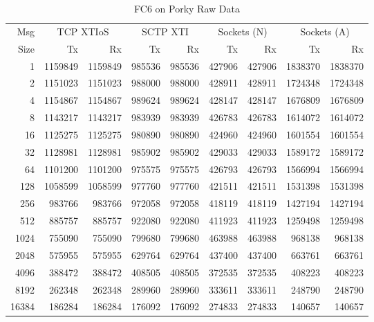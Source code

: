 \documentclass[letterpaper,final,notitlepage,twocolumn,10pt,twoside]{article}
\begin{document}
\begin{appendix}
\begin{table}[hbp]
\footnotesize
\begin{center}
\setlength{\tabcolsep}{0.2em}
\setlength{\arraycolsep}{0.2em}
\begin{tabular}{rrrrrrrrr}\\
Msg & \multicolumn{2}{c}{TCP XTIoS} & \multicolumn{2}{c}{SCTP XTI} & \multicolumn{2}{c}{Sockets (N)} & \multicolumn{2}{c}{Sockets (A)}\\
Size & Tx & Rx & Tx & Rx & Tx & Rx & Tx & Rx\\
\hline
\hline
1 & 1159849 & 1159849 & 985536 & 985536 & 427906 & 427906 & 1838370 & 1838370\\
2 & 1151023 & 1151023 & 988000 & 988000 & 428911 & 428911 & 1724348 & 1724348\\
4 & 1154867 & 1154867 & 989624 & 989624 & 428147 & 428147 & 1676809 & 1676809\\
8 & 1143217 & 1143217 & 983939 & 983939 & 426783 & 426783 & 1614072 & 1614072\\
16 & 1125275 & 1125275 & 980890 & 980890 & 424960 & 424960 & 1601554 & 1601554\\
32 & 1128981 & 1128981 & 985902 & 985902 & 429033 & 429033 & 1589172 & 1589172\\
64 & 1101200 & 1101200 & 975575 & 975575 & 426793 & 426793 & 1566994 & 1566994\\
128 & 1058599 & 1058599 & 977760 & 977760 & 421511 & 421511 & 1531398 & 1531398\\
256 & 983766 & 983766 & 972058 & 972058 & 418119 & 418119 & 1427194 & 1427194\\
512 & 885757 & 885757 & 922080 & 922080 & 411923 & 411923 & 1259498 & 1259498\\
1024 & 755090 & 755090 & 799680 & 799680 & 463988 & 463988 & 968138 & 968138\\
2048 & 575955 & 575955 & 629764 & 629764 & 437400 & 437400 & 663761 & 663761\\
4096 & 388472 & 388472 & 408505 & 408505 & 372535 & 372535 & 408223 & 408223\\
8192 & 262348 & 262348 & 289960 & 289960 & 333611 & 333611 & 248790 & 248790\\
16384 & 186284 & 186284 & 176092 & 176092 & 274833 & 274833 & 140657 & 140657\\
\hline
\end{tabular}
\end{center}
\normalsize
\caption[FC6 on Porky Raw Data]{FC6 on Porky Raw Data}
\label{table:fc6data}
\end{table}


\end{appendix}
\end{document}

